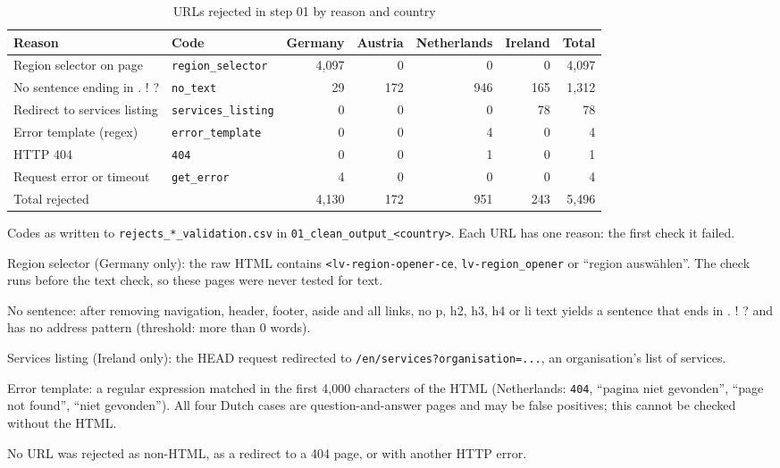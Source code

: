 \begin{table}[htbp]
\centering
\small
\begin{threeparttable}
\caption{URLs rejected in step 01 by reason and country}
\label{tab:dc_rejection_reasons}
\begin{tabular}{llrrrrr}
\hline
Reason & Code & Germany & Austria & Netherlands & Ireland & Total \\
\hline
Region selector on page & \texttt{region\_selector} & 4,097 & 0 & 0 & 0 & 4,097 \\
No sentence ending in . ! ? & \texttt{no\_text} & 29 & 172 & 946 & 165 & 1,312 \\
Redirect to services listing & \texttt{services\_listing} & 0 & 0 & 0 & 78 & 78 \\
Error template (regex) & \texttt{error\_template} & 0 & 0 & 4 & 0 & 4 \\
HTTP 404 & \texttt{404} & 0 & 0 & 1 & 0 & 1 \\
Request error or timeout & \texttt{get\_error} & 4 & 0 & 0 & 0 & 4 \\
\hline
Total rejected &  & 4,130 & 172 & 951 & 243 & 5,496 \\
\hline
\end{tabular}
\begin{tablenotes}
\footnotesize
\item Codes as written to \texttt{rejects\_*\_validation.csv} in \texttt{01\_clean\_output\_<country>}. Each URL has one reason: the first check it failed.
\item Region selector (Germany only): the raw HTML contains \texttt{<lv-region-opener-ce}, \texttt{lv-region\_opener} or ``region auswählen''. The check runs before the text check, so these pages were never tested for text.
\item No sentence: after removing navigation, header, footer, aside and all links, no p, h2, h3, h4 or li text yields a sentence that ends in . ! ? and has no address pattern (threshold: more than 0 words).
\item Services listing (Ireland only): the HEAD request redirected to \texttt{/en/services?organisation=...}, an organisation's list of services.
\item Error template: a regular expression matched in the first 4,000 characters of the HTML (Netherlands: \texttt{404}, ``pagina niet gevonden'', ``page not found'', ``niet gevonden''). All four Dutch cases are question-and-answer pages and may be false positives; this cannot be checked without the HTML.
\item No URL was rejected as non-HTML, as a redirect to a 404 page, or with another HTTP error.
\end{tablenotes}
\end{threeparttable}
\end{table}
